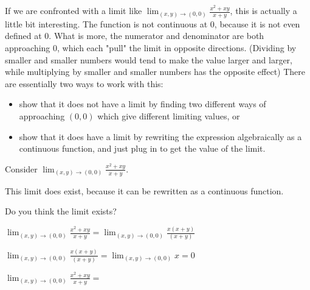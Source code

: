 \documentclass{ximera}
\begin{document}
	If we are confronted with a limit like $\displaystyle\lim_{(x,y) \to (0,0)} \frac{x^2+xy}{x+y}$, this is actually a little bit interesting.  The function is not continuous at $0$, because it is
	not even defined at $0$.  What is more, the numerator and denominator are both approaching $0$, which each "pull" the limit in opposite directions. 
	(Dividing by smaller and smaller numbers would tend to make the value larger and larger, while multiplying by smaller and smaller numbers has the opposite effect)
	  There are essentially two ways to work with this: 
          \begin{itemize}
\item show that it does not have a limit by finding two different ways of approaching $(0,0)$ which give different limiting values, or
\item show that it does have a limit by rewriting the expression algebraically as a continuous function, and just plug in to get the value of the limit.
          \end{itemize}

	
	\begin{question}
		Consider $\displaystyle\lim_{(x,y) \to (0,0)} \frac{x^2+xy}{x+y}$.
		\begin{solution}
			\begin{hint}
				This limit does exist, because it can be rewritten as a continuous function.
			\end{hint}
			Do you think the limit exists?
				\begin{multiple-choice}
				\end{multiple-choice}
		\end{solution}
		
		\begin{solution}
			\begin{hint}
				$\displaystyle\lim_{(x,y) \to (0,0)} \frac{x^2+xy}{x+y} = \displaystyle\lim_{(x,y) \to (0,0)} \frac{x(x+y)}{(x+y)}$
			\end{hint}
			\begin{hint}
				$\displaystyle\lim_{(x,y) \to (0,0)} \frac{x(x+y)}{(x+y)} = \displaystyle\lim_{(x,y) \to (0,0)} x = 0$
			\end{hint}
			$\displaystyle\lim_{(x,y) \to (0,0)} \frac{x^2+xy}{x+y} = $\answer{$0$}
		\end{solution}		
		
	\end{question}
	
\end{document}
